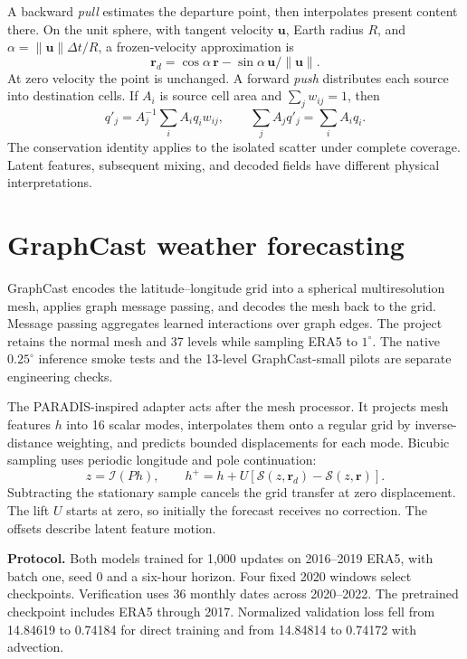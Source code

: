 \documentclass[10pt,a4paper]{article}
\begin{document}
A backward \emph{pull} estimates the departure point, then interpolates present content there. On the unit sphere, with tangent velocity \(\boldsymbol u\), Earth radius \(R\), and \(\alpha=\|\boldsymbol u\|\Delta t/R\), a frozen-velocity approximation is
\[
 \boldsymbol r_d=\cos\alpha\,\boldsymbol r-\sin\alpha\,\boldsymbol u/\|\boldsymbol u\|.
\]
At zero velocity the point is unchanged. A forward \emph{push} distributes each source into destination cells. If \(A_i\) is source cell area and \(\sum_jw_{ij}=1\), then
\[
 q'_j=A_j^{-1}\sum_i A_iq_iw_{ij},\qquad \sum_j A_jq'_j=\sum_i A_iq_i .
\]
The conservation identity applies to the isolated scatter under complete coverage. Latent features, subsequent mixing, and decoded fields have different physical interpretations.

\newpage
\section{GraphCast weather forecasting}
GraphCast \cite{graphcast} encodes the latitude--longitude grid into a spherical multiresolution mesh, applies graph message passing, and decodes the mesh back to the grid. Message passing aggregates learned interactions over graph edges. The project retains the normal mesh and 37 levels while sampling ERA5 to \(1^\circ\). The native \(0.25^\circ\) inference smoke tests and the 13-level GraphCast-small pilots are separate engineering checks.

The PARADIS-inspired adapter \cite{paradis} acts after the mesh processor. It projects mesh features \(h\) into 16 scalar modes, interpolates them onto a regular grid by inverse-distance weighting, and predicts bounded displacements for each mode. Bicubic sampling uses periodic longitude and pole continuation:
\[
 z=\mathcal I(Ph),\qquad h^+=h+U[\mathcal S(z,\boldsymbol r_d)-\mathcal S(z,\boldsymbol r)].
\]
Subtracting the stationary sample cancels the grid transfer at zero displacement. The lift \(U\) starts at zero, so initially the forecast receives no correction. The offsets describe latent feature motion.

\textbf{Protocol.} Both models trained for 1,000 updates on 2016--2019 ERA5, with batch one, seed 0 and a six-hour horizon. Four fixed 2020 windows select checkpoints. Verification uses 36 monthly dates across 2020--2022. The pretrained checkpoint includes ERA5 through 2017. Normalized validation loss fell from 14.84619 to 0.74184 for direct training and from 14.84814 to 0.74172 with advection.
\end{document}
